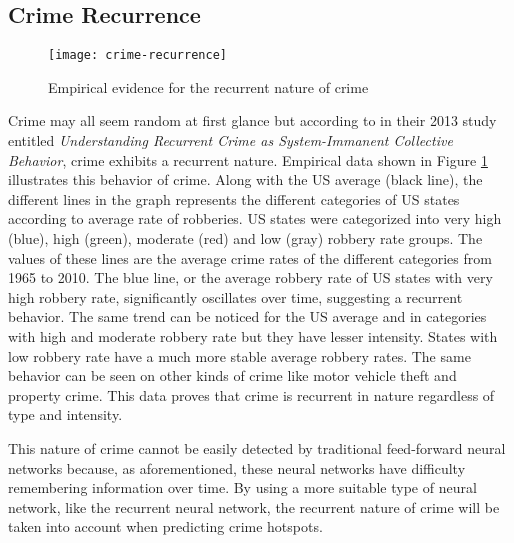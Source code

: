 \subsection{Crime Recurrence}
    \begin{figure}[H]
        \centering
        \texttt{[image: crime-recurrence]}
        \caption{Empirical evidence for the recurrent nature of crime \cite{perc2013understanding}}
        \label{fig:crime-recurrence}
    \end{figure}
    Crime may all seem random at first glance but according to \cite{perc2013understanding} in their 2013 study entitled \textit{Understanding Recurrent Crime as System-Immanent Collective Behavior}, crime exhibits a recurrent nature. Empirical data shown in Figure \ref{fig:crime-recurrence} illustrates this behavior of crime. Along with the US average (black line), the different lines in the graph represents the different categories of US states according to average rate of robberies. US states were categorized into very high (blue), high (green), moderate (red) and low (gray) robbery rate groups. The values of these lines are the average crime rates of the different categories from 1965 to 2010. The blue line, or the average robbery rate of US states with very high robbery rate, significantly oscillates over time, suggesting a recurrent behavior. The same trend can be noticed for the US average and in categories with high and moderate robbery rate but they have lesser intensity. States with low robbery rate have a much more stable average robbery rates. The same behavior can be seen on other kinds of crime like motor vehicle theft and property crime. This data proves that crime is recurrent in nature regardless of type and intensity.

    This nature of crime cannot be easily detected by traditional feed-forward neural networks because, as aforementioned, these neural networks have difficulty remembering information over time. By using a more suitable type of neural network, like the recurrent neural network, the recurrent nature of crime will be taken into account when predicting crime hotspots.